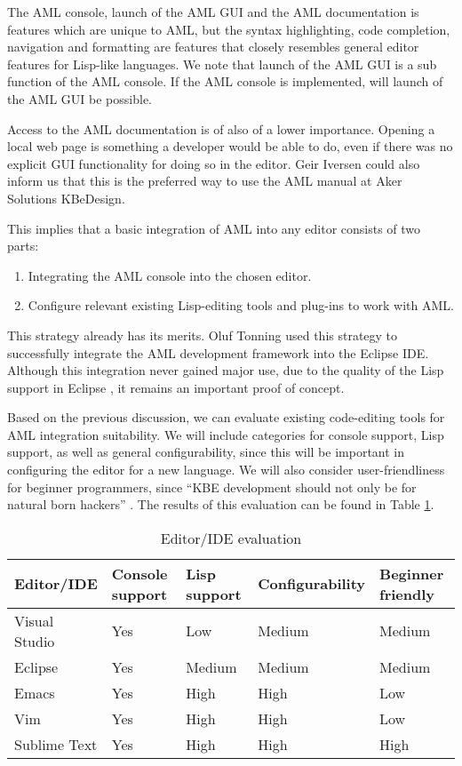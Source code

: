 The AML console, launch of the AML GUI and the AML documentation is features which are unique to AML, but the syntax highlighting, code completion, navigation and formatting are features that closely resembles general editor features for Lisp-like languages. We note that launch of the AML GUI is a sub function of the AML console. If the AML console is implemented, will launch of the AML GUI be possible.

Access to the AML documentation is of also of a lower importance. Opening a local web page is something a developer would be able to do, even if there was no explicit GUI functionality for doing so in the editor. Geir Iversen \cite{geir} could also inform us that this is the preferred way to use the AML manual at Aker Solutions KBeDesign.

This implies that a basic integration of AML into any editor consists of two parts:

\begin{enumerate}
    \item Integrating the AML console into the chosen editor.
    \item Configure relevant existing Lisp-editing tools and plug-ins to work with AML.
\end{enumerate}

This strategy already has its merits. Oluf Tonning \cite{oluf} used this strategy to successfully integrate the AML development framework into the Eclipse IDE. Although this integration never gained major use, due to the quality of the Lisp support in Eclipse \cite{geir}, it remains an important proof of concept.

Based on the previous discussion, we can evaluate existing code-editing tools for AML integration suitability. We will include categories for console support, Lisp support, as well as general configurability, since this will be important in configuring the editor for a new language. We will also consider user-friendliness for beginner programmers, since \enquote{KBE development should not only be for natural born hackers} \cite{rocca}. The results of this evaluation can be found in Table \ref{tab:editorEval}.

\begin{table}
    \begin{center}
        \begin{tabular}{| l | l | l | l | l |}
            \hline
            Editor/IDE & Console support & Lisp support & Configurability & Beginner friendly \\ \hline
            Visual Studio & Yes & Low & Medium & Medium \\ \hline
            Eclipse & Yes & Medium & Medium & Medium \\ \hline
            Emacs & Yes & High & High & Low \\ \hline
            Vim & Yes & High & High & Low \\ \hline
            Sublime Text & Yes & High & High & High \\ \hline
        \end{tabular}
    \end{center}
    \caption{Editor/IDE evaluation}
    \label{tab:editorEval}
\end{table}

